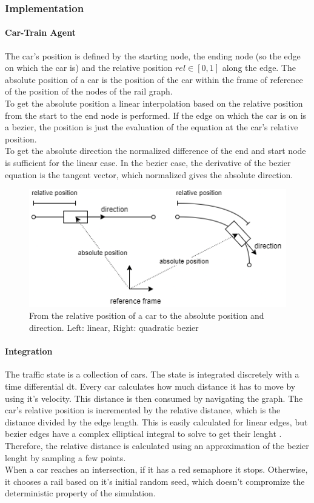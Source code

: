\documentclass[12pt]{article}
\begin{document}
\subsubsection{Implementation}
\paragraph{Car-Train Agent}
The car's position is defined by the starting node, the ending node (so the edge on which the car is) and the relative position \begin{math}{rel \in [0, 1]}\end{math} along the edge. The absolute position of a car is the position of the car within the frame of reference of the position of the nodes of the rail graph.\\
To get the absolute position a linear interpolation based on the relative position from the start to the end node is performed. If the edge on which the car is on is a bezier, the position is just the evaluation of the equation at the car's relative position.\\
To get the absolute direction the normalized difference of the end and start node is sufficient for the linear case. In the bezier case, the derivative of the bezier equation is the tangent vector, which normalized gives the absolute direction.
\begin{figure}[H]
\includegraphics[width=\textwidth]{abspos}
\caption{From the relative position of a car to the absolute position and direction. Left: linear, Right: quadratic bezier}
\end{figure}

\paragraph{Integration}
The traffic state is a collection of cars. The state is integrated discretely with a time differential dt. Every car calculates how much distance it has to move by using it's velocity. This distance is then consumed by navigating the graph. The car's relative position is incremented by the relative distance, which is the distance divided by the edge length. This is easily calculated for linear edges, but bezier edges have a complex elliptical integral to solve to get their lenght \cite{bezier}. Therefore, the relative distance is calculated using an approximation of the bezier lenght by sampling a few points. \\
When a car reaches an intersection, if it has a red semaphore it stops. Otherwise, it chooses a rail based on it's initial random seed, which doesn't compromize the deterministic property of the simulation.
\end{document}
